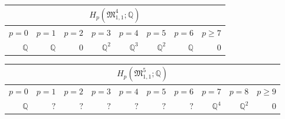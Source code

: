 \begin{center}
    \vspace{2.5ex}
    
    \begin{tabular}{|r|r|r|r|r|r|r|r|}
        \hline
        \multicolumn{8}{|c|}{$H_p( \mathfrak{M}_{1,1}^4; \mathbb Q )$} \\ \hline
        $p=0$&$p=1$&$p=2$&$p=3$&$p=4$&$p=5$&$p=6$&$p\ge7$\\ \hline \hline
        $\mathbb Q$&$\mathbb Q$&$0$&$\mathbb Q^2$&$\mathbb Q^3$&$\mathbb Q^2$&$\mathbb Q$&$0$\\ \hline
    \end{tabular}
    
    \vspace{2.5ex}
    
    \begin{tabular}{|r|r|r|r|r|r|r|r|r|r|}
        \hline
        \multicolumn{10}{|c|}{$H_p( \mathfrak{M}_{1,1}^5; \mathbb Q )$} \\ \hline
        $p=0$&$p=1$&$p=2$&$p=3$&$p=4$&$p=5$&$p=6$&$p=7$&$p=8$&$p\ge9$\\ \hline \hline
        $\mathbb Q$&$?$&$?$&$?$&$?$&$?$&$?$&$\mathbb Q^4$&$\mathbb Q^2$&$0$\\ \hline
    \end{tabular}
\end{center}

